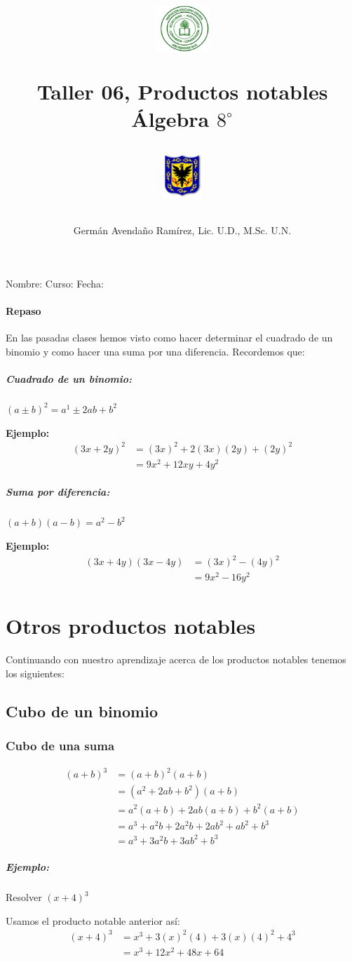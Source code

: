 \documentclass[10pt,twoside]{article}
\author{Germ\'an Avenda\~no Ram\'irez, Lic. U.D., M.Sc. U.N.}
\title{\begin{minipage}{.2\textwidth}
\includegraphics[height=1.75cm]{Images/logo-colegio.png}\end{minipage}
\begin{minipage}{.55\textwidth}
\begin{center}
Taller 06, Productos notables\\
Álgebra $8^{\circ}$
\end{center}
\end{minipage}\hfill
\begin{minipage}{.2\textwidth}
\includegraphics[height=1.75cm]{Images/logo-sed.png} 
\end{minipage}}
\date{}
\begin{document}
\maketitle
Nombre: \hrulefill Curso: \underline{\hspace*{44pt}} Fecha: \underline{\hspace*{2.5cm}}
\paragraph*{Repaso}
En las pasadas clases hemos visto como hacer determinar el cuadrado de un binomio y como hacer una suma por una diferencia. Recordemos que:
\subparagraph*{Cuadrado de un binomio:} $(a\pm b)^{2}=a^{1}\pm 2ab+b^{2}$

\textbf{Ejemplo:}
\begin{align*}
(3x+2y)^{2}&=(3x)^{2}+2(3x)(2y)+(2y)^{2}\\
&=9x^{2}+12xy+4y^{2}
\end{align*}
\subparagraph*{Suma por diferencia:} $(a+b)(a-b)=a^{2}-b^{2}$

\textbf{Ejemplo:}
\begin{align*}
(3x+4y)(3x-4y)&=(3x)^{2}-(4y)^{2}\\
&=9x^{2}-16y^{2}
\end{align*}
\section*{Otros productos notables}
Continuando con nuestro aprendizaje acerca de los productos notables tenemos los siguientes:
\subsection*{Cubo de un binomio}
\subsubsection*{Cubo de una suma}
\begin{align*}
(a+b)^{3}&=(a+b)^{2}(a+b)\\
&=(a^{2}+2ab+b^2)(a+b)\\
&=a^2(a+b)+2ab(a+b)+b^2(a+b)\\
&=a^3+a^2b+2a^2b+2ab^2+ab^2+b^3\\
&=a^3+3a^2b+3ab^2+b^3
\end{align*}
\subparagraph*{Ejemplo:} Resolver $(x+4)^3$

Usamos el producto notable anterior así:
\begin{align*}
(x+4)^3&=x^3+3(x)^2(4)+3(x)(4)^2+4^3\\
&=x^{3}+12x^2+48x+64
\end{align*}
\end{document}
